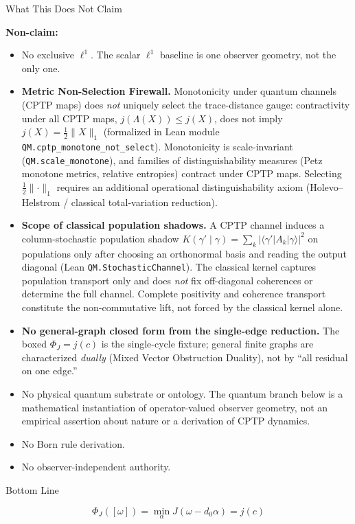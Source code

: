 \documentclass[
  11pt,
]{article}
\renewenvironment{quote}
  {\begin{leftbar}\small}
  {\end{leftbar}}
\newenvironment{nonclaim}{\begin{quote}\textbf{Non-claim:\ }}{\end{quote}}
\begin{document}
What This Does Not Claim

\begin{nonclaim}
\begin{itemize}
\item No exclusive $\ell^1$. The scalar $\ell^1$ baseline is one observer geometry, not the only one.
\item \textbf{Metric Non-Selection Firewall.} Monotonicity under quantum channels (CPTP maps) does \emph{not} uniquely select the trace-distance gauge: contractivity under all CPTP maps, $j(\Lambda(X)) \le j(X)$, does not imply $j(X) = \frac{1}{2}\|X\|_1$ (formalized in Lean module \texttt{QM.cptp\_monotone\_not\_select}). Monotonicity is scale-invariant (\texttt{QM.scale\_monotone}), and families of distinguishability measures (Petz monotone metrics, relative entropies) contract under CPTP maps. Selecting $\tfrac12\lVert\cdot\rVert_1$ requires an additional operational distinguishability axiom (Holevo--Helstrom / classical total-variation reduction).
\item \textbf{Scope of classical population shadows.} A CPTP channel induces a column-stochastic population shadow $K(\gamma'\mid\gamma) = \sum_k |\langle\gamma'|A_k|\gamma\rangle|^2$ on populations only after choosing an orthonormal basis and reading the output diagonal (Lean \texttt{QM.StochasticChannel}). The classical kernel captures population transport only and does \emph{not} fix off-diagonal coherences or determine the full channel. Complete positivity and coherence transport constitute the non-commutative lift, not forced by the classical kernel alone.
\item \textbf{No general-graph closed form from the single-edge reduction.} The boxed $\Phi_J=j(c)$ is the single-cycle fixture; general finite graphs are characterized \emph{dually} (Mixed Vector Obstruction Duality), not by ``all residual on one edge.''
\item No physical quantum substrate or ontology. The quantum branch below is a mathematical instantiation of operator-valued observer geometry, not an empirical assertion about nature or a derivation of CPTP dynamics.
\item No Born rule derivation.
\item No observer-independent authority.
\end{itemize}
\end{nonclaim}

Bottom Line

\[
\boxed{
\Phi_J([\omega])=\min_{\alpha}J(\omega-d_0\alpha)=j(c)
}
\]
\end{document}
